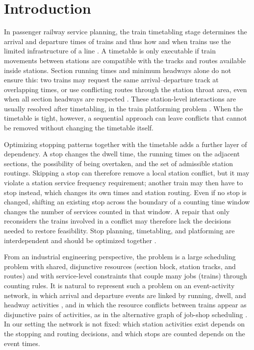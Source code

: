 \section{Introduction}\label{sec:intro}
In passenger railway service planning, the train timetabling stage determines the arrival and departure times of trains and thus how and when trains use the limited infrastructure of a line \citep{Cacchiani2012}. A timetable is only executable if train movements between stations are compatible with the tracks and routes available inside stations. Section running times and minimum headways alone do not ensure this: two trains may request the same arrival--departure track at overlapping times, or use conflicting routes through the station throat area, even when all section headways are respected \citep{Lusby2011survey,Wang2023}. These station-level interactions are usually resolved after timetabling, in the train platforming problem \citep{Caprara2011}. When the timetable is tight, however, a sequential approach can leave conflicts that cannot be removed without changing the timetable itself.

Optimizing stopping patterns together with the timetable adds a further layer of dependency. A stop changes the dwell time, the running times on the adjacent sections, the possibility of being overtaken, and the set of admissible station routings. Skipping a stop can therefore remove a local station conflict, but it may violate a station service frequency requirement; another train may then have to stop instead, which changes its own times and station routing. Even if no stop is changed, shifting an existing stop across the boundary of a counting time window changes the number of services counted in that window. A repair that only reconsiders the trains involved in a conflict may therefore lack the decisions needed to restore feasibility. Stop planning, timetabling, and platforming are interdependent and should be optimized together \citep{Yang2016,Dong2020,Xu2021}.

From an industrial engineering perspective, the problem is a large scheduling problem with shared, disjunctive resources (section block, station tracks, and routes) and with service-level constraints that couple many jobs (trains) through counting rules. It is natural to represent such a problem on an event-activity network, in which arrival and departure events are linked by running, dwell, and headway activities \citep{Serafini1989,Liebchen2007}, and in which the resource conflicts between trains appear as disjunctive pairs of activities, as in the alternative graph of job-shop scheduling \citep{Mascis2002,DAriano2007}. In our setting the network is not fixed: which station activities exist depends on the stopping and routing decisions, and which stops are counted depends on the event times.

